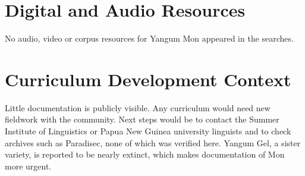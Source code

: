 \documentclass[12pt]{article}
\begin{document}
\section{Digital and Audio Resources}
No audio, video or corpus resources for Yangum Mon appeared in the searches.

\section{Curriculum Development Context}
Little documentation is publicly visible. Any curriculum would need new fieldwork with the community. Next steps would be to contact the Summer Institute of Linguistics or Papua New Guinea university linguists and to check archives such as Paradisec, none of which was verified here. Yangum Gel, a sister variety, is reported to be nearly extinct, which makes documentation of Mon more urgent.
\end{document}
